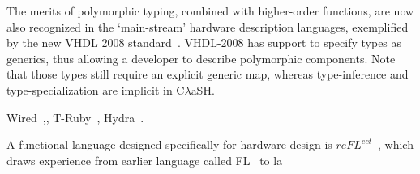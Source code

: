 \documentclass[conference]{IEEEtran}
\def\CLaSH{C$\lambda$aSH}
\begin{document}
The merits of polymorphic typing, combined with higher-order functions, are now also recognized in the `main-stream' hardware description languages, exemplified by the new VHDL 2008 standard~\cite{VHDL2008}. VHDL-2008 has support to specify types as generics, thus allowing a developer to describe polymorphic components. Note that those types still require an explicit generic map, whereas type-inference and type-specialization are implicit in \CLaSH.

Wired~\cite{Wired},, T-Ruby~\cite{T-Ruby}, Hydra~\cite{Hydra}. 

A functional language designed specifically for hardware design is $re{\mathit{FL}}^{ect}$~\cite{reFLect}, which draws experience from earlier language called FL~\cite{FL} to la

%
%



%
%
\end{document}
